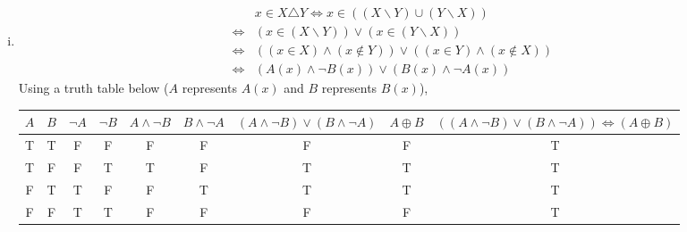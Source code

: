 \documentclass{article}[12pt]
\begin{document}
\begin{enumerate}[(i)]
\item 
\begin{align*}
&x\in X\triangle Y \Longleftrightarrow x\in ((X \backslash Y) \cup(Y \backslash X))\\
\Longleftrightarrow & (x\in (X \backslash Y))\vee (x\in (Y \backslash X))\\\Longleftrightarrow & ((x\in X)\wedge (x\not\in Y))\vee ((x\in Y)\wedge (x\not\in X))\\
\Longleftrightarrow & (A(x)\wedge \neg B(x))\vee (B(x)\wedge \neg A(x))
\end{align*}
Using a truth table below ($A$ represents $A(x)$ and $B$ represents $B(x)$), 
\begin{table}[H]\centering
\begin{tabular}{c|c||c|c||c|c||c||c|||c}
$A$ & $B$ & $\neg A$ & $\neg B$ & $A\wedge \neg B$ & $B\wedge \neg A$ & $(A\wedge \neg B)\vee (B\wedge \neg A)$ & $A \oplus B$ & $((A\wedge \neg B)\vee (B\wedge \neg A))\Leftrightarrow (A\oplus B)$ \\ \hline
T      & T      & F           & F           & F                      & F                      & F                                                   & F            & T                                                                                    \\
T      & F      & F           & T           & T                      & F                      & T                                                   & T            & T                                                                                    \\
F      & T      & T           & F           & F                      & T                      & T                                                   & T            & T                                                                                    \\
F      & F      & T           & T           & F                      & F                      & F                                                   & F            & T                                                                                   
\end{tabular}

\end{table}
\end{enumerate}
\end{document}
